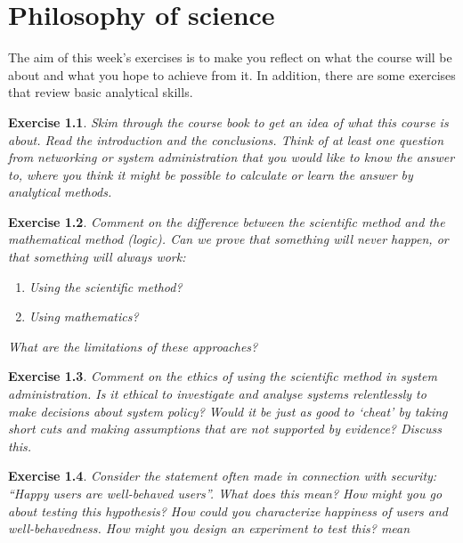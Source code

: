 \documentclass{book}
\newtheorem{exercise}{Exercise}
\begin{document}
\chapter{ Philosophy of science}

The aim of this week's exercises is to make you reflect on what the course
will be about and what you hope to achieve from it.
In addition, there are some exercises that review basic analytical skills.

\begin{exercise} 
Skim through the course book to get an idea of what this course is
about. Read the introduction and the conclusions.
Think of at least one question from networking or system
administration that you would like to know the answer to, where you
think it might be possible to calculate or learn the answer by
analytical methods.
\end{exercise}
\begin{solution}
\end{solution}

\begin{exercise} 
Comment on the difference between the scientific method and the
mathematical method (logic). Can we prove that something will never
happen, or that something will always work:
\begin{enumerate}
\item Using the scientific method?
\item Using mathematics?
\end{enumerate}
What are the limitations of these approaches?
\end{exercise}
\begin{solution}
\end{solution}

\begin{exercise} 
Comment on the ethics of using the scientific method in system
administration. Is it ethical to investigate and analyse systems
relentlessly to make decisions about system policy? Would it be
just as good to `cheat' by taking short cuts and making assumptions
that are not supported by evidence? Discuss this.
\end{exercise}
\begin{solution}
\end{solution}

\begin{exercise}
Consider the statement often made in connection with security: 
``Happy users are well-behaved users''. What does this mean?
How might you go about testing this hypothesis? How could you
characterize happiness of users and well-behavedness. How might
you design an experiment to test this?
mean
\end{exercise}
\begin{solution}
\end{solution}
\end{document}

